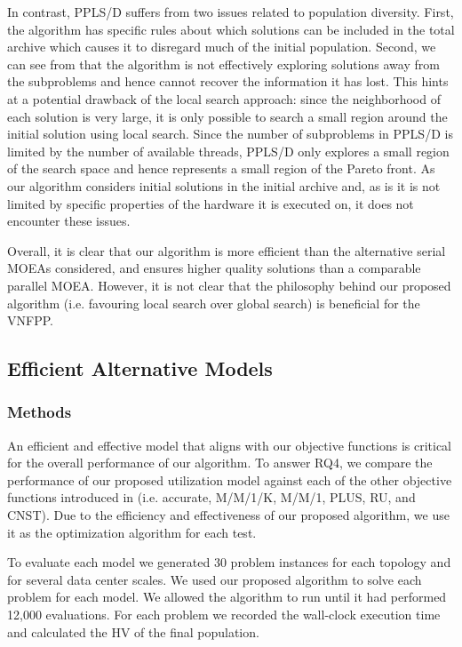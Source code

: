 In contrast, PPLS/D suffers from two issues related to population diversity. First, the algorithm has specific rules about which solutions can be included in the total archive which causes it to disregard much of the initial population. Second, we can see from  that the algorithm is not effectively exploring solutions away from the subproblems and hence cannot recover the information it has lost. This hints at a potential drawback of the local search approach: since the neighborhood of each solution is very large, it is only possible to search a small region around the initial solution using local search. Since the number of subproblems in PPLS/D is limited by the number of available threads, PPLS/D only explores a small region of the search space and hence represents a small region of the Pareto front. As our algorithm considers initial solutions in the initial archive and, as is it is not limited by specific properties of the hardware it is executed on, it does not encounter these issues.

Overall, it is clear that our algorithm is more efficient than the alternative serial MOEAs considered, and ensures higher quality solutions than a comparable parallel MOEA. However, it is not clear that the philosophy behind our proposed algorithm (i.e. favouring local search over global search) is beneficial for the VNFPP.

\subsection{Efficient Alternative Models}
\subsubsection{Methods}
An efficient and effective model that aligns with our objective functions is critical for the overall performance of our algorithm. To answer RQ4, we compare the performance of our proposed utilization model against each of the other objective functions introduced in  (i.e. accurate, M/M/1/K, M/M/1, PLUS, RU, and CNST). Due to the efficiency and effectiveness of our proposed algorithm, we use it as the optimization algorithm for each test.

To evaluate each model we generated 30 problem instances for each topology and for several data center scales. We used our proposed algorithm to solve each problem for each model. We allowed the algorithm to run until it had performed 12,000 evaluations. For each problem we recorded the wall-clock execution time and calculated the HV of the final population.

